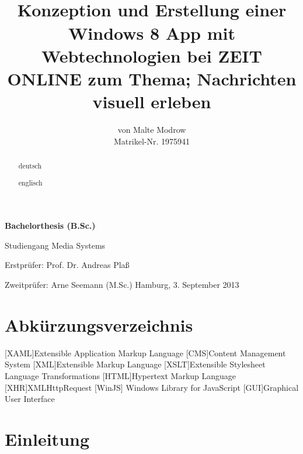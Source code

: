 \documentclass[12pt,a4paper,bibtotoc,abstracton]{scrartcl}
\author{von Malte Modrow \\ Matrikel-Nr. 1975941}
\title{\HRule \\ Konzeption und Erstellung einer Windows 8 App mit Webtechnologien bei ZEIT ONLINE zum Thema; Nachrichten visuell erleben \HRule}
\date{}
\begin{document}
\maketitle
\thispagestyle{empty}
\begin{center}		
	\LARGE
	\textbf{Bachelorthesis (B.Sc.)}
	
	\Large 
	Studiengang Media Systems 
	
	\vfill	
	\large
  	Erstprüfer: Prof. Dr. Andreas Plaß
	
	Zweitprüfer: Arne Seemann (M.Sc.)
	\vfill
	Hamburg, 3. September 2013	
\end{center}

\newpage
{}
\begin{abstract}
	deutsch
\end{abstract}

\begin{abstract}
	englisch
\end{abstract}

\newpage
\thispagestyle{plain}
\tableofcontents
\thispagestyle{plain}

\newpage
\listoffigures
\vspace{2cm}
\listoftables

\newpage
\lstlistoflistings
\vspace{2cm}
\section*{Abkürzungsverzeichnis}
\label{sec:abkürzungen}
\begin{acronym}[SEPSEP]
	[XAML]{Extensible Application Markup Language}
	 [CMS]{Content Management System}
	 [XML]{Extensible Markup Language}
	[XSLT]{Extensible Stylesheet Language Transformations}
	[HTML]{Hypertext Markup Language}
	[XHR]{XMLHttpRequest}
	[WinJS] {Windows Library for JavaScript}
	[GUI]{Graphical User Interface}
\end{acronym}

\newpage
\setcounter{page}{1}
\section{Einleitung}
\label{sec:einleitung}
\newpage
\end{document}
